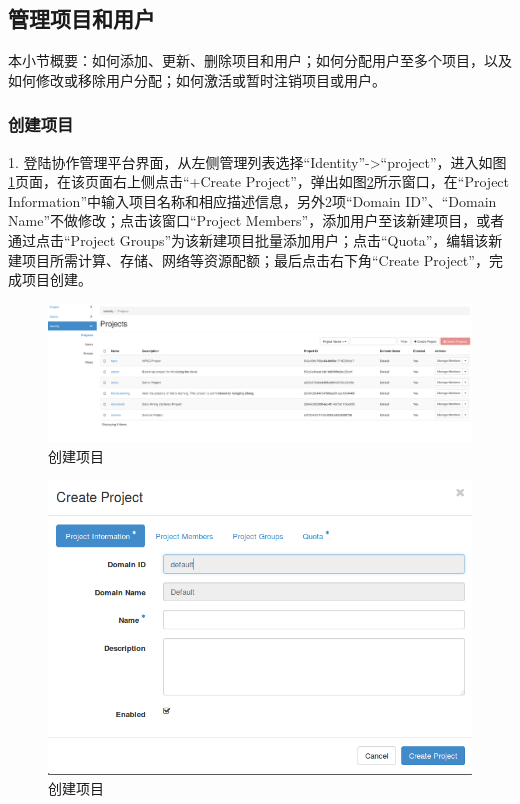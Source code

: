 \documentclass[12pt]{article}
\begin{document}
\subsection{管理项目和用户}
本小节概要：如何添加、更新、删除项目和用户；如何分配用户至多个项目，以及如何修改或移除用户分配；如何激活或暂时注销项目或用户。

\subsubsection{创建项目}
1. 登陆协作管理平台界面，从左侧管理列表选择``Identity''->``project''，进入如图\ref{fig:createProject}页面，在该页面右上侧点击``+Create Project''，弹出如图\ref{fig:createProject_1}所示窗口，在``Project Information''中输入项目名称和相应描述信息，另外2项``Domain ID''、``Domain Name''不做修改；点击该窗口``Project Members''，添加用户至该新建项目，或者通过点击``Project Groups''为该新建项目批量添加用户；点击``Quota''，编辑该新建项目所需计算、存储、网络等资源配额；最后点击右下角``Create Project''，完成项目创建。
\begin{figure}[!htb]
\centering
\includegraphics[width=6in]{./figures/createProject}
\caption{创建项目}
\label{fig:createProject}
\end{figure}
\begin{figure}[!htb]
\centering
\includegraphics[width=6in]{./figures/createProject_1}
\caption{创建项目}
\label{fig:createProject_1}
\end{figure}
\end{document}
